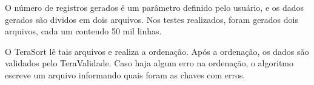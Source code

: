 O número de registros gerados é um parâmetro definido pelo usuário, e os dados gerados são dividos em dois arquivos. Nos testes realizados, foram gerados dois arquivos, cada um contendo 50 mil linhas. 

O TeraSort lê tais arquivos e realiza a ordenação. Após a ordenação, os dados são validados pelo TeraValidade. Caso haja algum erro na ordenação, o algoritmo escreve um arquivo informando quais foram as chaves com erros. 



% 
% 


% 
% 

